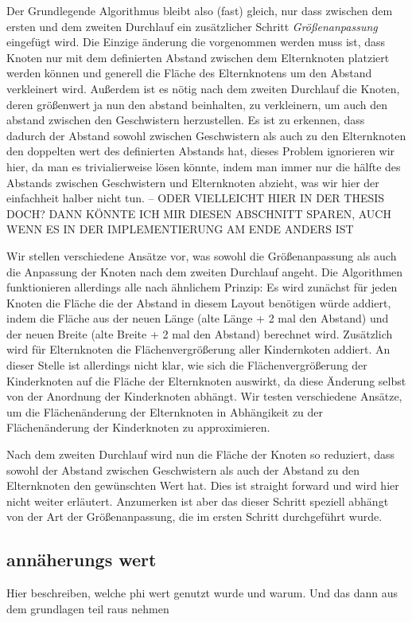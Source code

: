 Der Grundlegende Algorithmus bleibt also (fast) gleich, nur dass zwischen dem ersten und dem zweiten Durchlauf ein zusätzlicher Schritt \textit{Größenanpassung} eingefügt wird. Die Einzige änderung die vorgenommen werden muss ist, dass Knoten nur mit dem definierten Abstand zwischen dem Elternknoten platziert werden können und generell die Fläche des Elternknotens um den Abstand verkleinert wird.
Außerdem ist es nötig nach dem zweiten Durchlauf die Knoten, deren größenwert ja nun den abstand beinhalten, zu verkleinern, um auch den abstand zwischen den Geschwistern herzustellen. Es ist zu erkennen, dass dadurch der Abstand sowohl zwischen Geschwistern als auch zu den Elternknoten den doppelten wert des definierten Abstands hat, dieses Problem ignorieren wir hier, da man es trivialierweise lösen könnte, indem man immer nur die hälfte des Abstands zwischen Geschwistern und Elternknoten abzieht, was wir hier der einfachheit halber nicht tun. -- ODER VIELLEICHT HIER IN DER THESIS DOCH? DANN KÖNNTE ICH MIR DIESEN ABSCHNITT SPAREN, AUCH WENN ES IN DER IMPLEMENTIERUNG AM ENDE ANDERS IST

Wir stellen verschiedene Ansätze vor, was sowohl die Größenanpassung als auch die Anpassung der Knoten nach dem zweiten Durchlauf angeht.
Die Algorithmen funktionieren allerdings alle nach ähnlichem Prinzip: Es wird zunächst für jeden Knoten die Fläche die der Abstand in diesem Layout benötigen würde addiert, indem die Fläche aus der neuen Länge (alte Länge + 2 mal den Abstand) und der neuen Breite (alte Breite + 2 mal den Abstand) berechnet wird. Zusätzlich wird für Elternknoten die Flächenvergrößerung aller Kindernkoten addiert. An dieser Stelle ist allerdings nicht klar, wie sich die Flächenvergrößerung der Kinderknoten auf die Fläche der Elternknoten auswirkt, da diese Änderung selbst von der Anordnung der Kinderknoten abhängt. Wir testen verschiedene Ansätze, um die Flächenänderung der Elternknoten in Abhängikeit zu der Flächenänderung der Kinderknoten zu approximieren.

Nach dem zweiten Durchlauf wird nun die Fläche der Knoten so reduziert, dass sowohl der Abstand zwischen Geschwistern als auch der Abstand zu den Elternknoten den gewünschten Wert hat. Dies ist straight forward und wird hier nicht weiter erläutert. Anzumerken ist aber das dieser Schritt speziell abhängt von der Art der Größenanpassung, die im ersten Schritt durchgeführt wurde.

\subsection{annäherungs wert} 
Hier beschreiben, welche phi wert genutzt wurde und warum.
Und das dann aus dem grundlagen teil raus nehmen

